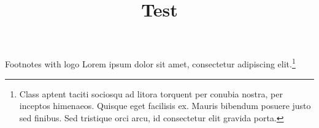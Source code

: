 \documentclass[12pt]{beamer}
\title{Test}
\begin{document}
    \begin{frame}{Footnotes with logo}
        Lorem ipsum dolor sit amet, consectetur adipiscing elit.\footnote{Class aptent  taciti sociosqu ad litora torquent per conubia nostra, per inceptos himenaeos.
            Quisque eget facilisis ex. Mauris bibendum posuere justo sed finibus.
            Sed tristique orci arcu, id consectetur elit gravida porta.}
    \end{frame}
\end{document}
